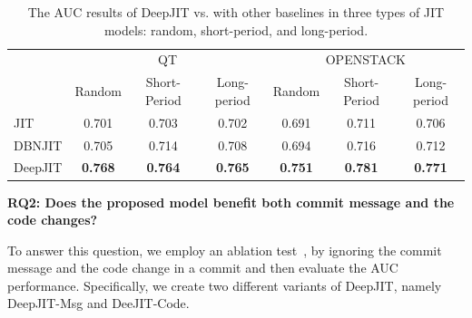 \begin{table}[t!]
	\centering
	\caption{The AUC results of DeepJIT vs. with other baselines in three types of JIT models: random, short-period, and long-period.}
	\begin{tabular}{|l|c|c|c|c|c|c|}
		\hline
		\multirow{2}[4]{*}{} & \multicolumn{3}{c|}{QT} & \multicolumn{3}{c|}{OPENSTACK} \\
		\cline{2-7}          & Random & Short-Period & Long-period & Random & Short-Period & Long-period \\
		\hline
		\hline
		JIT   & 0.701 & 0.703 & 0.702 & 0.691 & 0.711 & 0.706 \\
		\hline
		DBNJIT & 0.705 & 0.714 & 0.708 & 0.694 & 0.716 & 0.712 \\
		\hline
		DeepJIT & \textbf{0.768} & \textbf{0.764} & \textbf{0.765} & \textbf{0.751} & \textbf{0.781} & \textbf{0.771} \\
		\hline
	\end{tabular}%
	\label{tab:results}%
\end{table}%

\noindent \textbf{RQ2: Does the proposed model benefit both commit message and the code changes?}

To answer this question, we employ an ablation test~\cite{korbar2017deep, liu2017deep}, by ignoring the commit message and the code change in a commit and then evaluate the AUC performance. Specifically, we create two different variants of DeepJIT, namely DeepJIT-Msg and DeeJIT-Code. 



